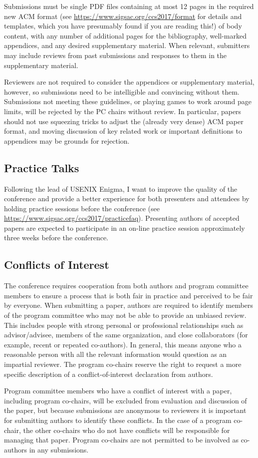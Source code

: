 Submissions must be single PDF files containing at most 12 pages in
the required new ACM format (see
\url{https://www.sigsac.org/ccs2017/format} for details and templates,
which you have presumably found if you are reading this!) of body
content, with any number of additional pages for the bibliography,
well-marked appendices, and any desired supplementary material.  When
relevant, submitters may include reviews from past submissions and
responses to them in the supplementary material.

Reviewers are not required to consider the appendices or supplementary
material, however, so submissions need to be intelligible and
convincing without them.  Submissions not meeting these guidelines, or
playing games to work around page limits, will be rejected by the PC
chairs without review.  In particular, papers should not use squeezing
tricks to adjust the (already very dense) ACM paper format, and moving
discussion of key related work or important definitions to appendices
may be grounds for rejection.

\subsection{Practice Talks}

Following the lead of USENIX Enigma, I want to improve the quality of
the conference and provide a better experience for both presenters and
attendees by holding practice sessions before the conference (see
\url{https://www.sigsac.org/ccs2017/practicefaq}). Presenting authors
of accepted papers are expected to participate in an on-line practice
session approximately three weeks before the conference.

\subsection{Conflicts of Interest}

The conference requires cooperation from both authors and program
committee members to ensure a process that is both fair in practice
and perceived to be fair by everyone. When submitting a paper, authors
are required to identify members of the program committee who may not
be able to provide an unbiased review.  This includes people with
strong personal or professional relationships such as advisor/advisee,
members of the same organization, and close collaborators (for
example, recent or repeated co-authors). In general, this means anyone
who a reasonable person with all the relevant information would
question as an impartial reviewer. The program co-chairs reserve the
right to request a more specific description of a conflict-of-interest
declaration from authors.

Program committee members who have a conflict of interest with a
paper, including program co-chairs, will be excluded from evaluation
and discussion of the paper, but because submissions are anonymous to
reviewers it is important for submitting authors to identify these
conflicts. In the case of a program co-chair, the other co-chairs who
do not have conflicts will be responsible for managing that paper.
Program co-chairs are not permitted to be involved as co-authors in
any submissions.


